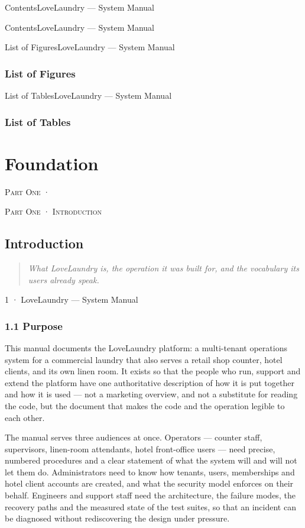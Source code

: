 \documentclass[11pt,a4paper,oneside]{book}
\begin{document}
ContentsLoveLaundry — System Manual

ContentsLoveLaundry — System Manual

List of FiguresLoveLaundry — System Manual

\section*{List of Figures}
List of TablesLoveLaundry — System Manual

\section*{List of Tables}
\part{Foundation}
\textsc{\small\color{crimson}Part One ·}\par\medskip
\textsc{\small\color{crimson}Part One · Introduction}\par\medskip
\chapter{Introduction}
\begin{quote}\itshape What LoveLaundry is, the operation it was built for, and the vocabulary its users already speak.\end{quote}
1 · LoveLaundry — System Manual

\section{1.1 Purpose}
This manual documents the LoveLaundry platform: a multi-tenant operations system for a commercial laundry that also serves a retail shop counter, hotel clients, and its own linen room. It exists so that the people who run, support and extend the platform have one authoritative description of how it is put together and how it is used — not a marketing overview, and not a substitute for reading the code, but the document that makes the code and the operation legible to each other.

The manual serves three audiences at once. Operators — counter staff, supervisors, linen-room attendants, hotel front-office users — need precise, numbered procedures and a clear statement of what the system will and will not let them do. Administrators need to know how tenants, users, memberships and hotel client accounts are created, and what the security model enforces on their behalf. Engineers and support staff need the architecture, the failure modes, the recovery paths and the measured state of the test suites, so that an incident can be diagnosed without rediscovering the design under pressure.
\end{document}
